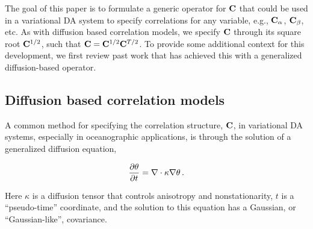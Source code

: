 The goal of this paper is to formulate a generic operator for $\mathbf{C}$
that could be
used in a variational DA system to specify
correlations for any variable, e.g., $\mathbf{C}_\alpha$, $\mathbf{C}_\beta$, etc.
As with diffusion based correlation models, we specify $\mathbf{C}$ through its
square root $\mathbf{C}^{1/2}$, such that
$\mathbf{C} = \mathbf{C}^{1/2}\mathbf{C}^{T/2}$.
To provide some additional context for this development,
we first review past work that has achieved this with a generalized
diffusion-based operator.


\subsection{Diffusion based correlation models}
\label{ssec:wc01_review}

A common method for specifying the correlation structure,
$\mathbf{C}$, in variational DA systems, especially in
oceanographic applications, is through the solution of a generalized diffusion
equation,
\begin{linenomath*}\begin{equation}
    \dfrac{\partial \theta}{\partial t} = \nabla \cdot \kappa \nabla\theta \, .
    \label{eq:diffusion}
\end{equation}\end{linenomath*}
Here $\kappa$ is a diffusion tensor that controls anisotropy and
nonstationarity, $t$ is a ``pseudo-time'' coordinate, and the solution to this
equation has a Gaussian, or ``Gaussian-like'', covariance.

